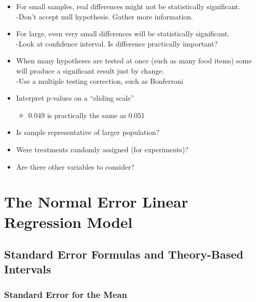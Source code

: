 \documentclass[]{book}
\providecommand{\tightlist}{%
  \setlength{\itemsep}{0pt}\setlength{\parskip}{0pt}}
\begin{document}
\begin{itemize}
\tightlist
\item
  For small samples, real differences might not be statistically
  significant.\\
  -Don't accept null hypothesis. Gather more information.\\
\item
  For large, even very small differences will be statistically
  significant.\\
  -Look at confidence interval. Is difference practically important?\\
\item
  When many hypotheses are tested at once (such as many food items) some
  will produce a significant result just by change.\\
  -Use a multiple testing correction, such as Bonferroni\\
\item
  Interpret p-values on a ``sliding scale''

  \begin{itemize}
  \tightlist
  \item
    0.049 is practically the same as 0.051
  \end{itemize}
\item
  Is sample representative of larger population?\\
\item
  Were treatments randomly assigned (for experiments)?\\
\item
  Are there other variables to consider?
\end{itemize}

\chapter{The Normal Error Linear Regression
Model}\label{the-normal-error-linear-regression-model}

\section{Standard Error Formulas and Theory-Based
Intervals}\label{standard-error-formulas-and-theory-based-intervals}

\subsection{Standard Error for the
Mean}\label{standard-error-for-the-mean}
\end{document}
